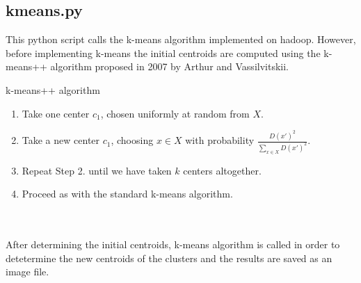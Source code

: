 \documentclass[11pt]{article}
\begin{document}
\subsection{kmeans.py}\label{kmeans.py}

This python script calls the k-means algorithm implemented on hadoop.
However, before implementing k-means the initial centroids are computed
using the k-means++ algorithm proposed in 2007 by Arthur and
Vassilvitskii. 
\begin{algorithm}
	\caption{k-means++ algorithm}
							
	\begin{enumerate}
		\item Take one center $\displaystyle c_{1} $, chosen uniformly at random from $\displaystyle X $.
		\item Take a new center $\displaystyle c_{1} $, choosing  $\displaystyle {x\in X} $ with probability $\displaystyle \frac{D(x')^2}{\sum_{x\in X} {D(x')^2}} $.
		\item Repeat Step 2. until we have taken $\displaystyle k $ centers altogether.
		\item Proceed as with the standard k-means algorithm.
	\end{enumerate}
\end{algorithm}
\\\\
After determining the initial centroids, k-means algorithm is called in
order to detetermine the new centroids of the clusters and the results
are saved as an image file.
\end{document}
